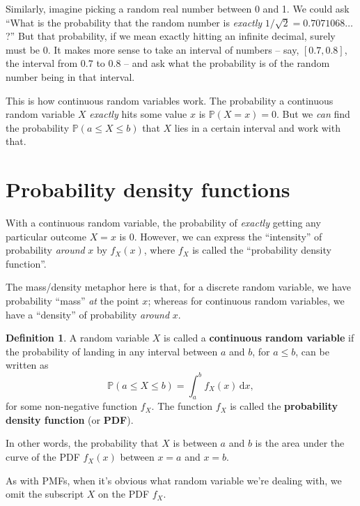 \documentclass[
  a4paper,
]{book}
\theoremstyle{definition}
\newtheorem{definition}{Definition}[chapter]
\theoremstyle{definition}
\theoremstyle{definition}
\theoremstyle{definition}
\theoremstyle{remark}
\begin{document}
Similarly, imagine picking a random real number between 0 and 1. We could ask ``What is the probability that the random number is \emph{exactly} \(1/\sqrt{2} = 0.7071068\dots\)?'' But that probability, if we mean exactly hitting an infinite decimal, surely must be 0. It makes more sense to take an interval of numbers -- say, \([0.7, 0.8]\), the interval from \(0.7\) to \(0.8\) -- and ask what the probability is of the random number being in that interval.

This is how continuous random variables work. The probability a continuous random variable \(X\) \emph{exactly} hits some value \(x\) is \(\mathbb P(X = x) = 0\). But we \emph{can} find the probability \(\mathbb P(a \leq X \leq b)\) that \(X\) lies in a certain interval and work with that.

\hypertarget{pdf}{%
\section{Probability density functions}\label{pdf}}

With a continuous random variable, the probability of \emph{exactly} getting any particular outcome \(X = x\) is 0. However, we can express the ``intensity'' of probability \emph{around} \(x\) by \(f_X(x)\), where \(f_X\) is called the ``probability density function''.

The mass/density metaphor here is that, for a discrete random variable, we have probability ``mass'' \emph{at} the point \(x\); whereas for continuous random variables, we have a ``density'' of probability \emph{around} \(x\).

\begin{definition}
A random variable \(X\) is called a \textbf{continuous random variable} if the probability of landing in any interval between \(a\) and \(b\), for \(a \leq b\), can be written as
\[ \mathbb P(a \leq X \leq b) = \int_a^b f_X(x) \, \mathrm{d}x , \]
for some non-negative function \(f_X\). The function \(f_X\) is called the \textbf{probability density function} (or \textbf{PDF}).
\end{definition}

In other words, the probability that \(X\) is between \(a\) and \(b\) is the area under the curve of the PDF \(f_X(x)\) between \(x = a\) and \(x = b\).

As with PMFs, when it's obvious what random variable we're dealing with, we omit the subscript \(X\) on the PDF \(f_X\).
\end{document}
